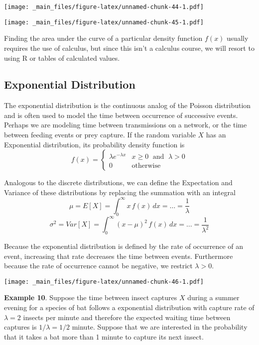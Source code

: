 \documentclass[]{book}
\begin{document}
\texttt{[image: \_main\_files/figure-latex/unnamed-chunk-44-1.pdf]}

\texttt{[image: \_main\_files/figure-latex/unnamed-chunk-45-1.pdf]}

Finding the area under the curve of a particular density function
\(f(x)\) usually requires the use of calculus, but since this isn't a
calculus course, we will resort to using R or tables of calculated
values.

\subsection{Exponential Distribution}\label{exponential-distribution}

The exponential distribution is the continuous analog of the Poisson
distribution and is often used to model the time between occurrence of
successive events. Perhaps we are modeling time between transmissions on
a network, or the time between feeding events or prey capture. If the
random variable \(X\) has an Exponential distribution, its probability
density function is \[f(x)=\begin{cases}
\lambda e^{-\lambda x} & x\ge0\;\textrm{ and }\;\lambda>0\\
0 & \textrm{otherwise}
\end{cases}\]

Analogous to the discrete distributions, we can define the Expectation
and Variance of these distributions by replacing the summation with an
integral
\[\mu = E[X] =  \int_{0}^{\infty}x\,f(x)\,dx = \dots = \frac{1}{\lambda} \]
\[\sigma^2 = Var[X] =   \int_{0}^{\infty}\left(x-\mu\right)^{2}\,f\left(x\right)\,dx =  \dots = \frac{1}{\lambda^{2}}\]

Because the exponential distribution is defined by the rate of
occurrence of an event, increasing that rate decreases the time between
events. Furthermore because the rate of occurrence cannot be negative,
we restrict \(\lambda>0\).

\texttt{[image: \_main\_files/figure-latex/unnamed-chunk-46-1.pdf]}

\textbf{Example 10}. Suppose the time between insect captures \(X\)
during a summer evening for a species of bat follows a exponential
distribution with capture rate of \(\lambda=2\) insects per minute and
therefore the expected waiting time between captures is
\(1/\lambda=1/2\) minute. Suppose that we are interested in the
probability that it takes a bat more than 1 minute to capture its next
insect.
\end{document}
